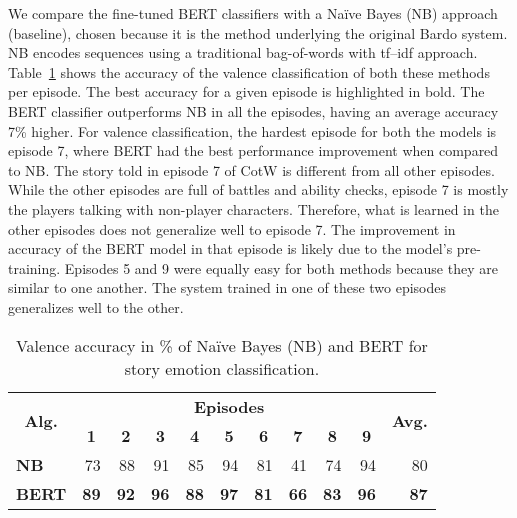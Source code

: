 We compare the fine-tuned BERT classifiers with a Na\"ive
Bayes (NB) approach (baseline), chosen because it is the method underlying the original Bardo system. NB encodes sequences using a traditional bag-of-words with tf–idf approach.
Table~\ref{tab:valence} shows the accuracy of the valence classification of both these methods per episode. The best accuracy for a given episode is highlighted in bold. The BERT classifier outperforms NB in all the episodes, having an average accuracy 7\% higher.
For valence classification, the hardest episode for both the models is episode 7, where BERT had the best performance improvement when compared to NB. The story told in episode 7 of CotW is different from all other episodes. While the other episodes are full of battles and ability checks, episode 7 is mostly the players talking with non-player characters.
Therefore, what is learned in the other episodes does not generalize well to episode 7. The improvement in accuracy of the BERT model in that episode is likely due to the model's pre-training. Episodes 5 and 9 were equally easy for both methods because they are similar to one another. The system trained in one of these two episodes generalizes well to the other.

\begin{table}[t!]
\centering
\setlength{\tabcolsep}{4pt}
\begin{tabular}{crrrrrrrrrr}
\toprule
\multirow{2}{*}{\textbf{Alg.}} & \multicolumn{9}{c}{\textbf{Episodes}} & \multirow{2}{*}{\textbf{Avg.}} \\
\cmidrule{2-10}
& \multicolumn{1}{c}{\textbf{1}}   & \multicolumn{1}{c}{\textbf{2}}   & \multicolumn{1}{c}{\textbf{3}}  & \multicolumn{1}{c}{\textbf{4}} & \multicolumn{1}{c}{\textbf{5}}  & \multicolumn{1}{c}{\textbf{6}}  & \multicolumn{1}{c}{\textbf{7}} & \multicolumn{1}{c}{\textbf{8}}  & \multicolumn{1}{c}{\textbf{9}} &    \\
\midrule
\multicolumn{1}{l}{\textbf{NB}}   &   73 & 88  &  91 & 85   &  94 & 81  &  41 & 74   & 94    &   80 \\
\multicolumn{1}{l}{\textbf{BERT}}   &  \textbf{89}  & \textbf{92}  & \textbf{96}  &  \textbf{88} & \textbf{97}   & \textbf{81} & \textbf{66}   &  \textbf{83}   &  \textbf{96} &  \textbf{87}  \\
\bottomrule
\end{tabular}
\caption{Valence accuracy in \% of Na\"ive Bayes (NB) and BERT for story emotion classification.}
\label{tab:valence}
\end{table}

